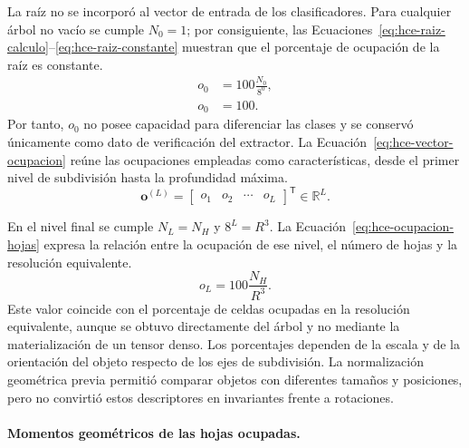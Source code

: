 La raíz no se incorporó al vector de entrada de los clasificadores. Para cualquier árbol no vacío se cumple $N_0=1$; por consiguiente, las Ecuaciones~\eqref{eq:hce-raiz-calculo}--\eqref{eq:hce-raiz-constante} muestran que el porcentaje de ocupación de la raíz es constante.
\begin{subequations}\label{eq:hce-ocupacion-raiz}
\begin{align}
o_0&=100\frac{N_0}{8^0}, \label{eq:hce-raiz-calculo} \\
o_0&=100. \label{eq:hce-raiz-constante}
\end{align}
\end{subequations}
Por tanto, $o_0$ no posee capacidad para diferenciar las clases y se conservó únicamente como dato de verificación del extractor. La Ecuación~\eqref{eq:hce-vector-ocupacion} reúne las ocupaciones empleadas como características, desde el primer nivel de subdivisión hasta la profundidad máxima.
\begin{equation}
\mathbf o^{(L)}
=
\begin{bmatrix}
o_1 & o_2 & \cdots & o_L
\end{bmatrix}^{\mathsf T}
\in\mathbb R^L.
\label{eq:hce-vector-ocupacion}
\end{equation}

En el nivel final se cumple $N_L=N_H$ y $8^L=R^3$. La Ecuación~\eqref{eq:hce-ocupacion-hojas} expresa la relación entre la ocupación de ese nivel, el número de hojas y la resolución equivalente.
\begin{equation}
o_L=100\frac{N_H}{R^3}.
\label{eq:hce-ocupacion-hojas}
\end{equation}
Este valor coincide con el porcentaje de celdas ocupadas en la resolución equivalente, aunque se obtuvo directamente del árbol y no mediante la materialización de un tensor denso. Los porcentajes dependen de la escala y de la orientación del objeto respecto de los ejes de subdivisión. La normalización geométrica previa permitió comparar objetos con diferentes tamaños y posiciones, pero no convirtió estos descriptores en invariantes frente a rotaciones.

\paragraph{Momentos geométricos de las hojas ocupadas.}

